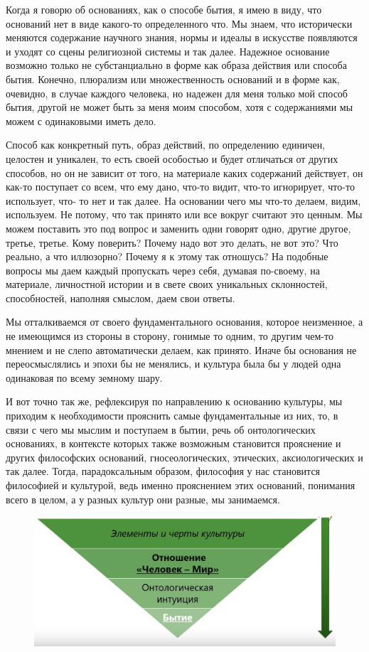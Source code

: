 Когда я
говорю об основаниях, как о способе бытия, я имею в виду, что оснований нет в
виде какого-то определенного что. Мы знаем, что исторически меняются содержание
научного знания, нормы и идеалы в искусстве появляются и уходят со сцены
религиозной системы и так далее. Надежное основание возможно только не
субстанциально в форме как образа действия или способа бытия. Конечно, плюрализм
или множественность оснований и в форме как, очевидно, в случае каждого
человека, но надежен для меня только мой способ бытия, другой не может быть за
меня моим способом, хотя с содержаниями мы можем с одинаковыми иметь дело.

Способ как конкретный путь, образ действий, по определению единичен, целостен и
уникален, то есть своей особостью и будет отличаться от других способов, но он
не зависит от того, на материале каких содержаний действует, он как-то поступает
со всем, что ему дано, что-то видит, что-то игнорирует, что-то использует, что-
то нет и так далее. На основании чего мы что-то делаем, видим, используем. Не
потому, что так принято или все вокруг считают это ценным. Мы можем поставить
это под вопрос и заменить одни говорят одно, другие другое, третье, третье. Кому
поверить? Почему надо вот это делать, не вот это? Что реально, а что иллюзорно?
Почему я к этому так отношусь? На подобные вопросы мы даем каждый пропускать
через себя, думавая по-своему, на материале, личностной истории и в свете своих
уникальных склонностей, способностей, наполняя смыслом, даем свои ответы. 

Мы
отталкиваемся от своего фундаментального основания, которое неизменное, а не
имеющимся из стороны в сторону, гонимые то одним, то другим чем-то мнением и не
слепо автоматически делаем, как принято. Иначе бы основания не переосмыслялись и
эпохи бы не менялись, и культура была бы у людей одна одинаковая по всему
земному шару. 

И вот точно так же, рефлексируя по направлению к основанию
культуры, мы приходим к необходимости прояснить самые фундаментальные из них,
то, в связи с чего мы мыслим и поступаем в бытии, речь об онтологических
основаниях, в контексте которых также возможным становится прояснение и других
философских оснований, гносеологических, этических, аксиологических и так
далее. Тогда, парадоксальным образом, философия у нас становится философией и
культурой, ведь именно прояснением этих оснований, понимания всего в целом, а у
разных культур они разные, мы занимаемся.

\begin{figure}[H]
    \centering
    \includegraphics[width=0.8\linewidth]{pictures/hz.png}
    \label{hz}
\end{figure}

